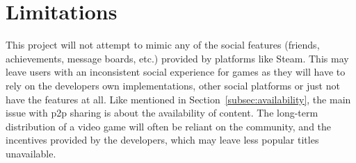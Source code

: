 
\section{Limitations}

This project will not attempt to mimic any of the social features (friends, achievements, message boards, etc.) provided by platforms like Steam. This may leave users with an inconsistent social experience for games as they will have to rely on the developers own implementations, other social platforms or just not have the features at all.
\x
Like mentioned in Section~\ref{subsec:availability}, the main issue with p2p sharing is about the availability of content. The long-term distribution of a video game will often be reliant on the community, and the incentives provided by the developers, which may leave less popular titles unavailable. 